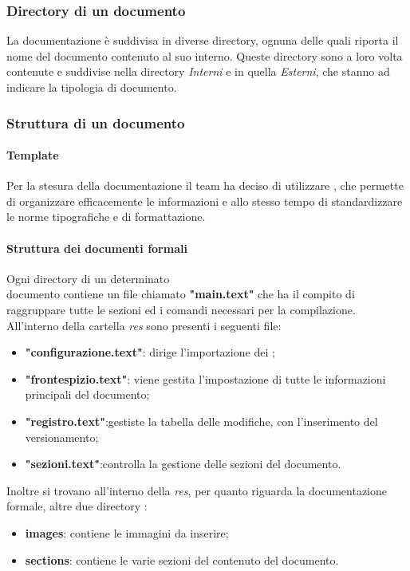 \subsubsection{Directory di un documento}
La documentazione è suddivisa in diverse directory, ognuna delle quali riporta il nome del documento contenuto al suo interno. Queste directory sono a loro volta contenute e suddivise nella directory \textit{Interni} e in quella \textit{Esterni}, che stanno ad indicare la tipologia di documento.

\subsubsection{Struttura di un documento}
\paragraph{Template} 
Per la stesura della documentazione il team ha deciso di utilizzare , che permette di organizzare efficacemente le informazioni e allo stesso tempo di standardizzare le norme tipografiche e di formattazione.

\paragraph{Struttura dei documenti formali}
Ogni directory di un determinato\\ documento contiene un file chiamato \textbf{"main.text"} che ha il compito di raggruppare tutte le sezioni ed i comandi necessari per la compilazione.\\
All'interno della cartella \textit{res} sono presenti i seguenti file:
\begin{itemize}
	\item \textbf{"configurazione.text"}: dirige l'importazione dei ;
	\item \textbf{"frontespizio.text"}: viene gestita l'impostazione di tutte le informazioni principali del documento;
	\item \textbf{"registro.text"}:gestiste la tabella delle modifiche, con l'inserimento del versionamento;
	\item \textbf{"sezioni.text"}:controlla la gestione delle sezioni del documento.
\end{itemize}
Inoltre si trovano all'interno della \textit{res}, per quanto riguarda la documentazione formale, altre due directory :
\begin{itemize}
	\item \textbf{images}: contiene le immagini da inserire;
	\item\textbf{sections}: contiene le varie sezioni del contenuto del documento.
\end{itemize}

